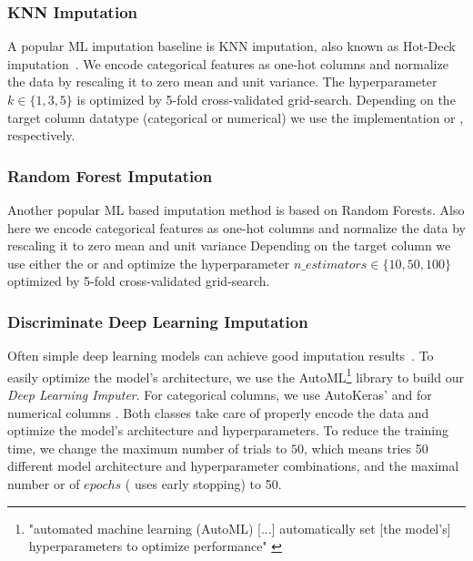 \subsubsection{KNN Imputation}
%
A popular ML imputation baseline is KNN imputation, also known as Hot-Deck imputation~\citep{Batista2003}.  We encode categorical features as one-hot columns and normalize the data by rescaling it to zero mean and unit variance. The hyperparameter $k \in \{1, 3, 5\}$ is optimized by 5-fold cross-validated grid-search.
Depending on the target column datatype (categorical or numerical) we use the  implementation  or , respectively.

\subsubsection{Random Forest Imputation}
%
Another popular ML based imputation method is based on Random Forests. Also here we encode categorical features as one-hot columns and normalize the data by rescaling it to zero mean and unit variance
Depending on the target column we use either the  or  and optimize the hyperparameter $n\_estimators \in \{10, 50, 100\}$ optimized by 5-fold cross-validated grid-search.

\subsubsection{Discriminate Deep Learning Imputation}
%
Often simple deep learning models can achieve good imputation results~\cite{Biessmann2018}. To easily optimize the model's architecture, we use the AutoML\footnote{"automated machine learning (AutoML) [...] automatically set [the model's] hyperparameters to optimize performance" \cite{AutoML}} library  \citep{AutoKeras} to build our \emph{Deep Learning Imputer}.
%
For categorical columns, we use AutoKeras'  and for numerical columns . Both classes take care of properly encode the data and optimize the model's architecture and hyperparameters. To reduce the training time, we change the maximum number of trials to $50$, which means  tries 50 different model architecture and hyperparameter combinations, and the maximal number or of $epochs$ ( uses early stopping) to 50.


